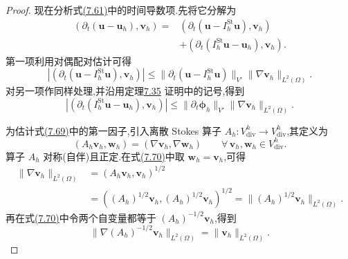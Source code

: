 \begin{proof}
现在分析式\hyperref[eq:time-dependent-pressure-error-numerator]{(7.61)}中的时间导数项.先将它分解为
\[
\begin{aligned}
  (\partial_t(\bm{u}-\bm{u}_h),\bm{v}_h)
  ={}&(\partial_t(\bm{u}-I_h^{\mathrm{St}}\bm{u}),\bm{v}_h)\\
  &+(\partial_t(I_h^{\mathrm{St}}\bm{u}-\bm{u}_h),\bm{v}_h).
\end{aligned}
\]
第一项利用对偶配对估计可得
\begin{equation}\label{eq:time-dependent-pressure-error-time-derivative-projection}
  |(\partial_t(\bm{u}-I_h^{\mathrm{St}}\bm{u}),\bm{v}_h)|
  \le \|\partial_t(\bm{u}-I_h^{\mathrm{St}}\bm{u})\|_{V'}
       \|\nabla\bm{v}_h\|_{L^2(\Omega)}.
\end{equation}
对另一项作同样处理,并沿用定理\hyperref[thm:time-dependent-fem-velocity-error]{7.35} 证明中的记号,得到
\begin{equation}\label{eq:time-dependent-pressure-error-time-derivative-discrete}
  |(\partial_t(I_h^{\mathrm{St}}\bm{u}-\bm{u}_h),\bm{v}_h)|
  \le \|\partial_t\symbf{\phi}_h\|_{V'}
       \|\nabla\bm{v}_h\|_{L^2(\Omega)}.
\end{equation}

为估计式\hyperref[eq:time-dependent-pressure-error-time-derivative-discrete]{(7.69)}中的第一因子,引入离散 Stokes 算子 $A_h:V_{\mathrm{div}}^h\to V_{\mathrm{div}}^h$,其定义为
\begin{equation}\label{eq:time-dependent-pressure-error-discrete-stokes-operator}
  (A_h\bm{v}_h,\bm{w}_h)
  =(\nabla\bm{v}_h,\nabla\bm{w}_h)
  \qquad\forall\,\bm{v}_h,\bm{w}_h\in V_{\mathrm{div}}^h.
\end{equation}
算子 $A_h$ 对称(自伴)且正定.在式\hyperref[eq:time-dependent-pressure-error-discrete-stokes-operator]{(7.70)}中取 $\bm{w}_h=\bm{v}_h$,可得
\begin{equation}\label{eq:time-dependent-pressure-error-discrete-stokes-norm}
\begin{aligned}
  \|\nabla\bm{v}_h\|_{L^2(\Omega)}
  &=(A_h\bm{v}_h,\bm{v}_h)^{1/2}\\
  &=((A_h)^{1/2}\bm{v}_h,(A_h)^{1/2}\bm{v}_h)^{1/2}
   =\|(A_h)^{1/2}\bm{v}_h\|_{L^2(\Omega)}.
\end{aligned}
\end{equation}
再在式\hyperref[eq:time-dependent-pressure-error-discrete-stokes-operator]{(7.70)}中令两个自变量都等于 $(A_h)^{-1/2}\bm{v}_h$,得到
\begin{equation}\label{eq:time-dependent-pressure-error-discrete-stokes-negative-norm}
  \|\nabla(A_h)^{-1/2}\bm{v}_h\|_{L^2(\Omega)}
  =\|\bm{v}_h\|_{L^2(\Omega)}.
\end{equation}


\end{proof}

